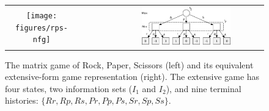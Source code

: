 \begin{figure}
\begin{center}
\begin{tabular}{ccc}
\texttt{[image: figures/rps-nfg]} & ~~~~~ & \includegraphics[width=0.6\textwidth]{figures/rps-new} \\
\end{tabular}
\end{center}
\caption{The matrix game of Rock, Paper, Scissors (left) and its equivalent extensive-form game representation (right). The extensive
game has four states, two information sets ($I_1$ and $I_2$),
and nine terminal histories: $\{ Rr, Rp, Rs, Pr, Pp, Ps, Sr, Sp, Ss \}$. \label{fig:rps-equiv}}
\end{figure}


